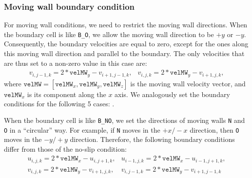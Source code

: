 \documentclass[a4paper, 12pt]{article}
\begin{document}
\subsubsection{Moving wall boundary condition}\label{sec:moving_wall}
For moving wall conditions, we need to restrict the moving wall directions.
When the boundary cell is like \texttt{B\_O}, we allow the moving wall direction to be $+y$ or $-y$. Consequently, the boundary velocities are equal to zero,
 except for the ones along this moving wall direction and parallel to the boundary. The only velocities that are thus set to a non-zero value in this case are:
\begin{equation}
\begin{array}{ll}
v_{i,j-1,k} = 2*\texttt{velMW}_y-v_{i+1,j-1,k}, & v_{i,j,k} = 2*\texttt{velMW}_y-v_{i+1,j,k}, 
\end{array}
\end{equation}
where $\texttt{velMW} = [\texttt{velMW}_x, \texttt{velMW}_y, \texttt{velMW}_z]$ is the moving wall velocity vector, and $\texttt{velMW}_x$ is its component along the $x$ axis. We analogously set the boundary conditions for the following 5 cases: .

When the boundary cell is like \texttt{B\_NO}, we set the directions of moving walls \texttt{N} and \texttt{O} in a ``circular'' way. For example, if \texttt{N} moves in the $+x/-x$ direction, then \texttt{O} moves in the $-y/+y$ direction. Therefore, the following boundary conditions differ from those of the no-slip condition:
\begin{equation}
\begin{array}{ll}
u_{i,j,k} = 2*\texttt{velMW}_x-u_{i,j+1,k}, & u_{i-1,j,k} = 2*\texttt{velMW}_x-u_{i-1,j+1,k}, \\
v_{i,j,k} = 2*\texttt{velMW}_y-v_{i+1,j,k}, & v_{i,j-1,k} = 2*\texttt{velMW}_y-v_{i+1,j-1,k}
\end{array}
\end{equation}
\end{document}
